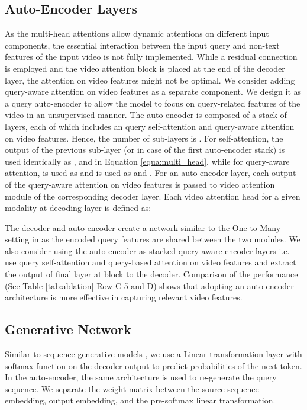 \documentclass[11pt,a4paper]{article}
\begin{document}
\subsection{Auto-Encoder Layers}
As the multi-head attentions allow dynamic attentions on different input components, the essential interaction between the input query and non-text features of the input video is not fully implemented. While a residual connection is employed and the video attention block is placed at the end of the decoder layer, the attention on video features might not be optimal. We consider adding query-aware attention on video features as a separate component. We design it as a query auto-encoder to allow the model to focus on query-related features of the video in an unsupervised manner. The auto-encoder is composed of a stack of  layers, each of which includes an query self-attention and query-aware attention on video features. Hence, the number of sub-layers is . For self-attention, the output of the previous sub-layer  (or  in case of the first auto-encoder stack) is used identically as ,  and  in Equation \ref{equa:multi_head}, while for query-aware attention,  is used as  and  is used as  and . For an  auto-encoder layer, each output of the query-aware attention on video features  is passed to video attention module of the corresponding  decoder layer. Each video attention head  for a given modality  at decoding layer  is defined as: 



The decoder and auto-encoder create a network similar to the One-to-Many setting in \cite{luong2015multi} as the encoded query features are shared between the two modules. We also consider using the auto-encoder as stacked query-aware encoder layers i.e. use query self-attention and query-based attention on video features and extract the output of final layer at  block to the decoder. Comparison of the performance (See Table \ref{tab:ablation} Row C-5 and D) shows that adopting an auto-encoder architecture is more effective in capturing relevant video features.

\subsection{Generative Network}
Similar to sequence generative models \cite{Sutskever14seq2seq,Manning2017ACS}, we use a Linear transformation layer with softmax function on the decoder output to predict probabilities of the next token. In the auto-encoder, the same architecture is used to re-generate the query sequence. We separate the weight matrix between the source sequence embedding, output embedding, and the pre-softmax linear transformation. 
\end{document}
